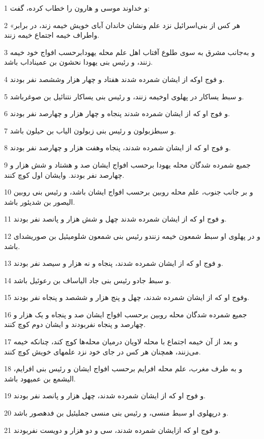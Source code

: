\par 1 و خداوند موسی و هارون را خطاب کرده، گفت:
\par 2 «هر کس از بنی‌اسرائیل نزد علم ونشان خاندان آبای خویش خیمه زند، در برابر واطراف خیمه اجتماع خیمه زنند.
\par 3 و به‌جانب مشرق به سوی طلوع آفتاب اهل علم محله یهودابرحسب افواج خود خیمه زنند، و رئیس بنی یهودا نحشون بن عمیناداب باشد.
\par 4 و فوج اوکه از ایشان شمرده شدند هفتاد و چهار هزار وششصد نفر بودند.
\par 5 و سبط یساکار در پهلوی اوخیمه زنند، و رئیس بنی یساکار نتنائیل بن صوغرباشد.
\par 6 و فوج او که از ایشان شمرده شدند پنجاه و چهار هزار و چهارصد نفر بودند.
\par 7 و سبطزبولون و رئیس بنی زبولون الیاب بن حیلون باشد.
\par 8 و فوج او که از ایشان شمرده شدند، پنجاه وهفت هزار و چهارصد نفر بودند.
\par 9 جمیع شمرده شدگان محله یهودا برحسب افواج ایشان صد و هشتاد و شش هزار و چهارصد نفر بودند. وایشان اول کوچ کنند.
\par 10 و بر جانب جنوب، علم محله روبین برحسب افواج ایشان باشد، و رئیس بنی روبین الیصور بن شدیئور باشد.
\par 11 و فوج او که از ایشان شمرده شدند چهل و شش هزار و پانصد نفر بودند.
\par 12 و در پهلوی او سبط شمعون خیمه زنندو رئیس بنی شمعون شلومیئیل بن صوریشدای باشد.
\par 13 و فوج او که از ایشان شمرده شدند، پنجاه و نه هزار و سیصد نفر بودند.
\par 14 و سبط جادو رئیس بنی جاد الیاساف بن رعوئیل باشد.
\par 15 وفوج او که از ایشان شمرده شدند، چهل و پنج هزار و ششصد و پنجاه نفر بودند.
\par 16 جمیع شمرده شدگان محله روبین برحسب افواج ایشان صد و پنجاه و یک هزار و چهارصد و پنجاه نفربودند و ایشان دوم کوچ کنند.
\par 17 و بعد از آن خیمه اجتماع با محله لاویان درمیان محله‌ها کوچ کند، چنانکه خیمه می‌زنند، همچنان هر کس در جای خود نزد علمهای خویش کوچ کنند.
\par 18 و به طرف مغرب، علم محله افرایم برحسب افواج ایشان و رئیس بنی افرایم، الیشمع بن عمیهود باشد.
\par 19 و فوج او که از ایشان شمرده شدند، چهل هزار و پانصد نفر بودند.
\par 20 و درپهلوی او سبط منسی، و رئیس بنی منسی جملیئیل بن فدهصور باشد.
\par 21 و فوج او که ازایشان شمرده شدند، سی و دو هزار و دویست نفربودند.
